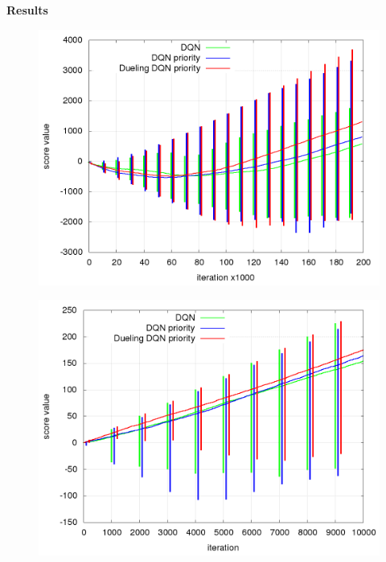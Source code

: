 \documentclass[xcolor=dvipsnames]{beamer}
\begin{document}
\begin{frame}{\bf Results}

\begin{figure}[!htb]
  \centering
  \includegraphics[scale=0.18]{../../rl_results/dqn_test/rl_progress_training.png}
  \label{img:dqn_test_training_progress}
\end{figure}


\begin{figure}[!htb]
  \centering
  \includegraphics[scale=0.18]{../../rl_results/dqn_test/rl_progress_testing.png}
  \label{img:dqn_test_testing_progress}
\end{figure}

\end{frame}
\end{document}
